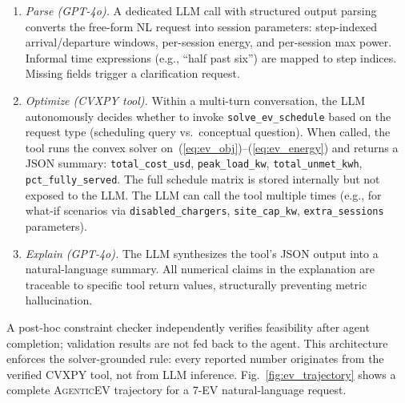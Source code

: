 \begin{enumerate}[leftmargin=*,label=\arabic*,itemsep=1pt]
\item \textit{Parse (GPT-4o).} A dedicated LLM call with structured output parsing converts the free-form NL request into session parameters: step-indexed arrival/departure windows, per-session energy, and per-session max power. Informal time expressions (e.g., ``half past six'') are mapped to step indices. Missing fields trigger a clarification request.

\item \textit{Optimize (CVXPY tool).} Within a multi-turn conversation, the LLM autonomously decides whether to invoke \texttt{solve\_ev\_schedule} based on the request type (scheduling query vs.\ conceptual question). When called, the tool runs the convex solver on~(\ref{eq:ev_obj})--(\ref{eq:ev_energy}) and returns a JSON summary: \texttt{total\_cost\_usd}, \texttt{peak\_load\_kw}, \texttt{total\_unmet\_kwh}, \texttt{pct\_fully\_served}. The full schedule matrix is stored internally but not exposed to the LLM. The LLM can call the tool multiple times (e.g., for what-if scenarios via \texttt{disabled\_chargers}, \texttt{site\_cap\_kw}, \texttt{extra\_sessions} parameters).

\item \textit{Explain (GPT-4o).} The LLM synthesizes the tool's JSON output into a natural-language summary. All numerical claims in the explanation are traceable to specific tool return values, structurally preventing metric hallucination.
\end{enumerate}


A post-hoc constraint checker independently verifies feasibility after agent completion; validation results are not fed back to the agent. This architecture enforces the solver-grounded rule: every reported number originates from the verified CVXPY tool, not from LLM inference. Fig.~\ref{fig:ev_trajectory} shows a complete \textsc{AgenticEV} trajectory for a 7-EV natural-language request.

